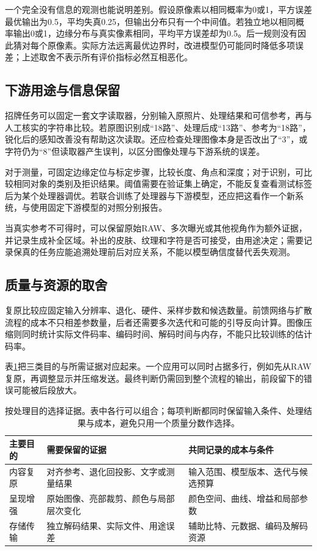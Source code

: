 一个完全没有信息的观测也能说明差别。假设原像素以相同概率为0或1，平方误差最优输出为0.5，平均失真0.25，但输出分布只有一个中间值。若独立地以相同概率输出0或1，边缘分布与真实像素相同，平均平方误差却为0.5。后一规则没有因此猜对每个原像素。实际方法远离最优边界时，改进模型仍可能同时降低多项误差；上述取舍不表示所有评价指标必然互相恶化。

\subsection{下游用途与信息保留}
\label{sec:vision-restoration-downstream}

招牌任务可以固定一套文字读取器，分别输入原照片、处理结果和可信参考，再与人工核实的字符串比较。若原图识别成“18路”、处理后成“13路”、参考为“18路”，锐化后的感知改善没有帮助这次读取。还应检查处理图像本身是否改出了“3”，或字符仍为“8”但读取器产生误判，以区分图像处理与下游系统的误差。

对于测量，可固定边缘定位与标定步骤，比较长度、角点和深度；对于识别，可比较相同对象的类别及拒识结果。阈值需要在验证集上确定，不能反复查看测试标签后为某个处理器调优。若联合训练了处理器与下游模型，还应把这看作一个新系统，与使用固定下游模型的对照分别报告。

当真实参考不可得时，可以保留原始RAW、多次曝光或其他视角作为额外证据，并记录生成补全区域。补出的皮肤、纹理和字符是否可接受，由用途决定；需要记录保真的任务应能追溯处理前后对应关系，不能以模型确信度替代丢失观测。

\subsection{质量与资源的取舍}
\label{sec:vision-restoration-resources}

复原比较应固定输入分辨率、退化、硬件、采样步数和候选数量。前馈网络与扩散流程的成本不只相差参数量，后者还需要多次迭代和可能的引导反向计算。图像压缩则同时统计实际文件码率、编码时间、解码时间与内存，不能只比较训练的估计码率。

表\ref{tab:vision-restoration-choice}把三类目的与所需证据对应起来。一个应用可以同时占据多行，例如先从RAW复原，再调整显示并压缩发送。最终判断仍需回到整个流程的输出，前段留下的错误可能被后段放大。

\begin{table}[htbp]
 \centering
 \small
 \begin{tabularx}{\linewidth}{@{}p{18mm}XX@{}}
  \toprule
  主要目的 & 需要保留的证据 & 共同记录的成本与条件\\
  \midrule
  内容复原 & 对齐参考、退化回投影、文字或测量结果 & 输入范围、模型版本、迭代与候选预算\\
  呈现增强 & 原始图像、亮部裁剪、颜色与局部层次变化 & 颜色空间、曲线、增益和局部参数\\
  存储传输 & 独立解码结果、实际文件、用途误差 & 辅助比特、元数据、编码及解码资源\\
  \bottomrule
 \end{tabularx}
 \caption{按处理目的选择证据。表中各行可以组合；每项判断都同时保留输入条件、处理结果与成本，避免只用一个质量分数作选择。}
 \label{tab:vision-restoration-choice}
\end{table}

